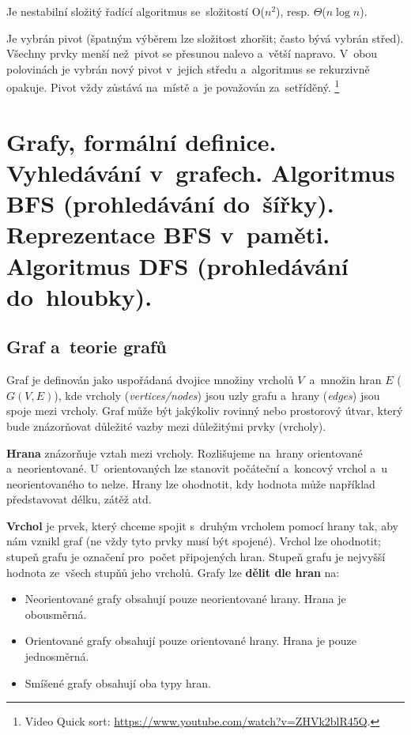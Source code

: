 Je nestabilní složitý řadící algoritmus se~složitostí O(\( n^2 \)), resp. \( \Theta \)(\( n\log{n} \)).

Je vybrán pivot (špatným výběrem lze složitost zhoršit; často bývá vybrán střed). Všechny prvky menší než~pivot se přesunou nalevo a~větší napravo. V~obou polovinách je vybrán nový pivot v~jejich středu a~algoritmus se rekurzivně opakuje. Pivot vždy zůstává na~místě a~je považován za~setříděný.%
\footnote{Video Quick sort: \url{https://www.youtube.com/watch?v=ZHVk2blR45Q}.}

\clearpage
\section{Grafy, formální definice. Vyhledávání v~grafech. Algoritmus BFS (prohledávání do~šířky). Reprezentace BFS v~paměti. Algoritmus DFS (prohledávání do~hloubky).}

\subsection{Graf a~teorie grafů}

Graf je definován jako uspořádaná dvojice množiny vrcholů \( V \)~a~množin hran \( E \) (\( G(V,E) \)), kde vrcholy (\emph{vertices/nodes}) jsou uzly grafu a~hrany (\emph{edges}) jsou spoje mezi vrcholy. Graf může být jakýkoliv rovinný nebo prostorový útvar, který bude znázorňovat důležité vazby mezi důležitými prvky (vrcholy).

\textbf{Hrana} znázorňuje vztah mezi vrcholy. Rozlišujeme na~hrany orientované a~neorientované. U~orientovaných lze stanovit počáteční a~koncový vrchol a~u neorientovaného to nelze. Hrany lze ohodnotit, kdy hodnota může například představovat délku, zátěž atd.

\textbf{Vrchol} je prvek, který chceme spojit s~druhým vrcholem pomocí hrany tak, aby nám vznikl graf (ne vždy tyto prvky musí být spojené). Vrchol lze ohodnotit; stupeň grafu je označení pro~počet připojených hran. Stupeň grafu je nejvyšší hodnota ze~všech stupňů jeho vrcholů. Grafy lze \textbf{dělit dle hran} na:

\begin{itemize}
	\item Neorientované grafy obsahují pouze neorientované hrany. Hrana je obousměrná.
	\item Orientované grafy obsahují pouze orientované hrany. Hrana je pouze jednosměrná.
	\item Smíšené grafy obsahují oba typy hran.
\end{itemize}

